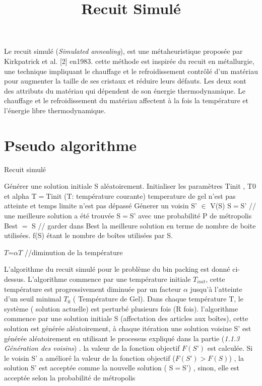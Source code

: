 \documentclass[12pt]{article}
\title{Recuit Simulé}
\begin{document}
    Le recuit simulé (\emph{Simulated annealing}), est une métaheuristique proposée par Kirkpatrick et al. [2] en1983. cette méthode est inspirée du recuit en métallurgie, une technique impliquant le chauffage et le refroidissement contrôlé d'un matériau pour augmenter la taille de ses cristaux et réduire leurs défauts. Les deux sont des attributs du matériau qui dépendent de son énergie thermodynamique. Le chauffage et le refroidissement du matériau affectent à la fois la température et l'énergie libre thermodynamique.

\section{Pseudo algorithme}

\begin{algorithm}[H]
    \caption{Recuit simulé}
    \begin{algorithmic}
    \STATE Générer une solution initiale S aléatoirement. 
    \STATE Initialiser les paramètres Tinit , T0 et alpha 
    \STATE T$=$Tinit  (T: température courante)
        \STATE temperature de gel n'est pas atteinte et temps limite n'est pas dépassé
        \REPEAT{}
            \STATE Génerer un voisin S' $\in$ V(S) 
                \STATE S$=$S' // une meilleure solution a été trouvée 
            \ELSE
                \STATE S$=$S' avec une probabilité P de métropolis 
            \ENDIF
                \STATE  Best $=$ S // garder dans Best la meilleure solution en terme de nombre de boite utilisées. f(S) étant le nombre de                 boîtes utilisées par S.

            \ENDIF
        \STATE $T$=$ \alpha T $  //diminution de la température 
    \ENDWHILE
     
\end{algorithmic}
\end{algorithm}

    L’algorithme du recuit simulé pour le problème du bin packing est donné ci-dessus.
 L’algorithme commence par une température initiale \emph{$T_{init}$}, cette température est progressivement diminuée par un facteur $\alpha$ jusqu'à l’atteinte d’un seuil minimal \emph{$T_{0}$} ( Température de Gel). 
Dans chaque température T, le système ( solution actuelle) est perturbé plusieurs fois (R fois). 
l’algorithme commence par une solution initiale S (affectation des articles aux boîtes), 
cette solution est générée aléatoirement, à chaque itération une solution voisine S’ est générée aléatoirement en utilisant le processus expliqué dans la partie (\emph{1.1.3 Génération des voisins}) . 
la valeur de la fonction objectif $F (S’)$ est calculée. 
Si le voisin S’ a amélioré la valeur de la fonction objectif ($ F(S’)> F(S)$)  , 
la solution S’ est acceptée comme la nouvelle solution ( S$= $S’) , sinon, elle est acceptée selon la probabilité de métropolis \newline
\end{document}
